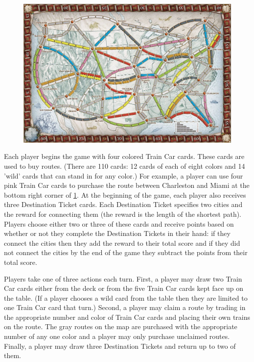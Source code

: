 \begin{figure}[h]
\centering
\includegraphics[scale=.4]{figures/board}
\label{fig:board}
\end{figure}

Each player begins the game with four 
colored Train Car cards.
These cards are used to buy routes.
(There are 110 cards: 12 cards of each of eight 
colors and 14 'wild' cards
that can stand in for any color.)
For example, a player can use four pink Train Car cards to purchase
the route between Charleston and Miami
at the bottom right corner of \cref{fig:board}.
At the beginning of the game,
each player also receives three 
Destination Ticket cards.
Each Destination Ticket specifies
two cities and the reward for connecting them
(the reward is the length of the shortest path).
Players choose either two or three of 
these cards and
receive points based on whether
or not they complete the Destination Tickets
in their hand:
if they connect the cities then 
they add the reward to their total score and
if they did not connect the 
cities by the end of the game they
subtract the points from their total score.

Players take one of three actions each turn.
First, a player may draw two Train Car cards either
from the deck or from the five Train Car cards
kept face up on the table. 
(If a player chooses a wild card from the table
then they are limited to one Train Car card that turn.)
Second, a player may claim a route by trading in
the appropriate number and color of Train Car cards
and placing their own trains on the route.
The gray routes on the map are purchased with
the appropriate number of any one color
and a player may only purchase unclaimed routes.
Finally, a player may draw three Destination Tickets
and return up to two of them.

